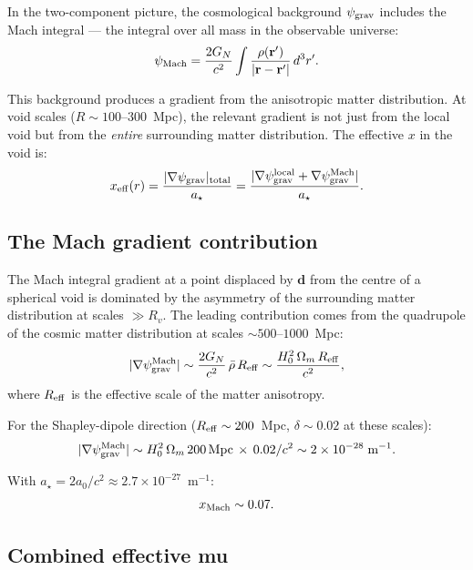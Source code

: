 \documentclass[11pt]{article}
\newcommand{\ee}[1]{\times 10^{#1}}
\newcommand{\psigrav}{\psi_{\rm grav}}
\newcommand{\GN}{G_N}
\newcommand{\aM}{a_0}
\begin{document}
In the two-component picture, the cosmological background $\psigrav$
includes the Mach integral --- the integral over all mass in the
observable universe:
\begin{equation}
\psi_{\rm Mach} = \frac{2\GN}{c^2}\int\frac{\rho(\mathbf{r}')}{|\mathbf{r}-\mathbf{r}'|}\,d^3r'.
\end{equation}

This background produces a gradient from the anisotropic matter
distribution. At void scales ($R \sim 100$--$300$~Mpc), the relevant
gradient is not just from the local void but from the \emph{entire}
surrounding matter distribution. The effective $x$ in the void is:
\begin{equation}
x_{\rm eff}(r) = \frac{|\nabla\psigrav|_{\rm total}}{a_\star}
= \frac{|\nabla\psigrav^{\rm local} + \nabla\psigrav^{\rm Mach}|}{a_\star}.
\end{equation}

\subsection{The Mach gradient contribution}

The Mach integral gradient at a point displaced by $\mathbf{d}$ from
the centre of a spherical void is dominated by the asymmetry of the
surrounding matter distribution at scales $\gg R_v$. The leading
contribution comes from the quadrupole of the cosmic matter
distribution at scales $\sim 500$--$1000$~Mpc:
\begin{equation}
|\nabla\psigrav^{\rm Mach}| \sim \frac{2\GN}{c^2}\,\bar{\rho}\,R_{\rm eff}
\sim \frac{H_0^2\,\Omega_m\,R_{\rm eff}}{c^2},
\end{equation}
where $R_{\rm eff}$ is the effective scale of the matter anisotropy.

For the Shapley-dipole direction ($R_{\rm eff} \sim 200$~Mpc,
$\delta \sim 0.02$ at these scales):
\begin{equation}
|\nabla\psigrav^{\rm Mach}| \sim H_0^2\,\Omega_m\,200\,\text{Mpc}\,\times\,0.02/c^2
\sim 2\ee{-28}\;\text{m}^{-1}.
\end{equation}

With $a_\star = 2\aM/c^2 \approx 2.7\ee{-27}$~m$^{-1}$:
\begin{equation}
x_{\rm Mach} \sim 0.07.
\end{equation}

\subsection{Combined effective mu}
\end{document}
